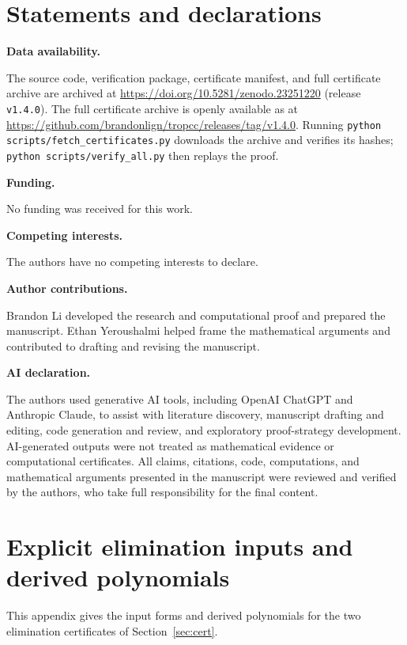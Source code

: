 \documentclass[11pt]{amsart}
\newcommand{\topic}[1]{\par\addvspace{1.4ex}\noindent\textbf{#1}\par\nobreak\smallskip\noindent}
\theoremstyle{definition}\newtheorem{definition}[theorem]{Definition}\theoremstyle{remark}\newtheorem{remark}[theorem]{Remark}
\begin{document}
\section*{Statements and declarations}
\topic{Data availability.} The source code, verification package, certificate manifest, and full certificate archive are archived at \url{https://doi.org/10.5281/zenodo.23251220} (release \texttt{v1.4.0}). The full certificate archive is openly available as  at \url{https://github.com/brandonlign/tropcc/releases/tag/v1.4.0}. Running \texttt{python scripts/fetch\_certificates.py} downloads the archive and verifies its hashes; \texttt{python scripts/verify\_all.py} then replays the proof.

\topic{Funding.} No funding was received for this work.

\topic{Competing interests.} The authors have no competing interests to declare.

\topic{Author contributions.} Brandon Li developed the research and computational proof and prepared the manuscript. Ethan Yeroushalmi helped frame the mathematical arguments and contributed to drafting and revising the manuscript.

\topic{AI declaration.} The authors used generative AI tools, including OpenAI ChatGPT and Anthropic Claude, to assist with literature discovery, manuscript drafting and editing, code generation and review, and exploratory proof-strategy development. AI-generated outputs were not treated as mathematical evidence or computational certificates. All claims, citations, code, computations, and mathematical arguments presented in the manuscript were reviewed and verified by the authors, who take full responsibility for the final content.

\appendix
\section{Explicit elimination inputs and derived polynomials}\label{app:elim}
This appendix gives the input forms and derived polynomials for the two elimination certificates of Section~\ref{sec:cert}.
\end{document}
